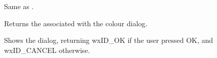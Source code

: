 \label{wxcolourdialogcreate}


Same as .

\label{wxcolourdialoggetcolourdata}


Returns the  associated with the colour dialog.

\label{wxcolourdialogshowmodal}


Shows the dialog, returning wxID\_OK if the user pressed OK, and wxID\_CANCEL
otherwise.


